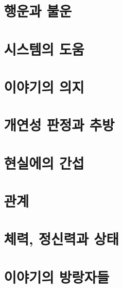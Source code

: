 \documentclass{report}
\begin{document}
	\section{행운과 불운}
		
	
	\section{시스템의 도움}
		
	
	\section{이야기의 의지}
		
	
	\section{개연성 판정과 추방}
		
	
	\section{현실에의 간섭}
		
	
	\section{관계}
		
	
	\section{체력, 정신력과 상태}
		
	
\ifprintout\else
	\section{이야기의 방랑자들}
		
\fi
\end{document}
